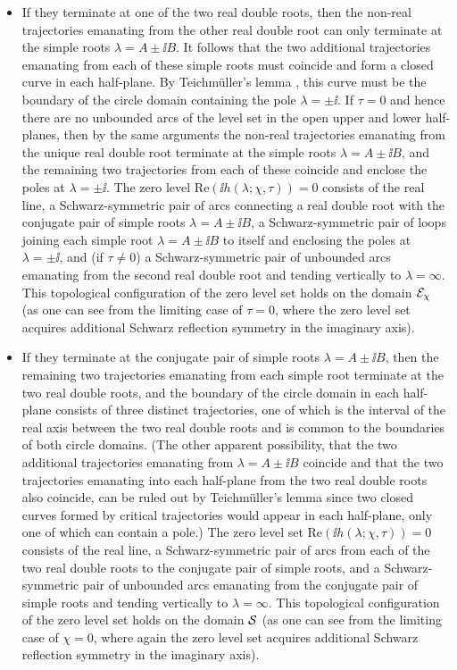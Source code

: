 \begin{itemize}
\item
If they terminate at one of the two real double roots, then the non-real trajectories emanating from the other real double root can only terminate at the simple roots $\lambda=A\pm\ii B$.  It follows that the two additional trajectories emanating from each of these simple roots must coincide and form a closed curve in each half-plane.  By Teichm\"uller's lemma \cite[Theorem 14.1]{Strebel84}, this curve must be the boundary of the circle domain containing the pole $\lambda=\pm\ii$. If $\tau=0$ and hence there are no unbounded arcs of the level set in the open upper and lower half-planes, then by the same arguments the non-real trajectories emanating from the unique real double root terminate at the simple roots $\lambda=A\pm\ii B$, and the remaining two trajectories from each of these coincide and enclose the poles at $\lambda=\pm\ii$.  The zero level $\mathrm{Re}(\ii h(\lambda;\chi,\tau))=0$ consists of the real line, a Schwarz-symmetric pair of arcs connecting a real double root with the conjugate pair of simple roots $\lambda=A\pm\ii B$, a Schwarz-symmetric pair of loops joining each simple root $\lambda=A\pm\ii B$ to itself and enclosing the poles at $\lambda=\pm\ii$, and (if $\tau\neq 0$) a Schwarz-symmetric pair of unbounded arcs emanating from the second real double root and tending vertically to $\lambda=\infty$.  This topological configuration of the zero level set holds on the domain $\mathcal{E}_\chi$ (as one can see from the limiting case of $\tau=0$, where the zero level set acquires additional Schwarz reflection symmetry in the imaginary axis).
\item
If they terminate at the conjugate pair of simple roots $\lambda=A\pm \ii B$, then the remaining two trajectories emanating from each simple root terminate at the two real double roots, and the boundary of the circle domain in each half-plane consists of three distinct trajectories, one of which is the interval of the real axis between the two real double roots and is common to the boundaries of both circle domains.  (The other apparent possibility, that the two additional trajectories emanating from $\lambda=A\pm\ii B$ coincide and that the two trajectories emanating into each half-plane from the two real double roots also coincide, can be ruled out by Teichm\"uller's lemma since two closed curves formed by critical trajectories would appear in each half-plane, only one of which can contain a pole.)  The zero level set $\mathrm{Re}(\ii h(\lambda;\chi,\tau))=0$ consists of the real line, a Schwarz-symmetric pair of arcs from each of the two real double roots to the conjugate pair of simple roots, and a Schwarz-symmetric pair of unbounded arcs emanating from the conjugate pair of simple roots and tending vertically to $\lambda=\infty$.  This topological configuration of the zero level set holds on the domain $\mathcal{S}$ (as one can see from the limiting case of $\chi=0$, where again the zero level set acquires additional Schwarz reflection symmetry in the imaginary axis).
\end{itemize}

